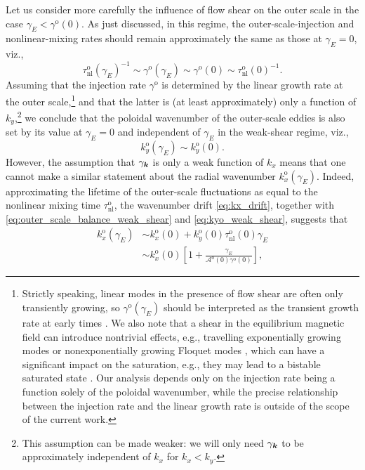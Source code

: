 \documentclass{jpp}
\newcommand{\taunlo}{\tau_\text{nl}^\text{o}}
\newcommand{\kxo}{k_x^\text{o}}
\newcommand{\kyo}{k_y^\text{o}}
\newcommand{\gammao}{\gamma^\text{o}}
\newcommand{\taunloO}{\tau_{\text{nl}}^\text{o}(0)}
\newcommand{\kxoO}{k_{x}^\text{o}(0)}
\newcommand{\kyoO}{k_{y}^\text{o}(0)}
\newcommand{\gammaoO}{\gamma^\text{o}(0)}
\newcommand{\gammaE}{\gamma_{E}}
\newcommand{\A}{\mathcal{A}}
\newcommand{\AoO}{\A^\text{o}(0)}
\begin{document}
Let us consider more carefully the influence of flow shear on the outer scale in the case \(\gammaE < \gammaoO\). As just discussed, in this regime, the outer-scale-injection and nonlinear-mixing rates should remain approximately the same as those at \mbox{\(\gammaE = 0\)}, viz.,
\begin{equation}
	\taunlo(\gammaE)^{-1} \sim \gammao(\gammaE) \sim \gammaoO \sim \taunloO^{-1}.
	\label{eq:outer_scale_balance_weak_shear}
\end{equation}
Assuming that the injection rate \(\gammao\) is determined by the linear growth rate at the outer scale,\footnote{Strictly speaking, linear modes in the presence of flow shear are often only transiently growing, so \(\gammao(\gammaE)\) should be interpreted as the transient growth rate at early times \citep{highcock11, sch12}. We also note that a shear in the equilibrium magnetic field can introduce nontrivial effects, e.g., travelling exponentially growing modes \citep{newton10} or nonexponentially growing Floquet modes \citep{cooper88,waelbroeck91}, which can have a significant impact on the saturation, e.g., they may lead to a bistable saturated state \citep{christen22}. Our analysis depends only on the injection rate being a function solely of the poloidal wavenumber, while the precise relationship between the injection rate and the linear growth rate is outside of the scope of the current work.} and that the latter is (at least approximately) only a function of \(k_y\),\footnote{This assumption can be made weaker: we will only need \(\gamma_{\boldsymbol{k}}\) to be approximately independent of \(k_x\) for \(k_x < k_y\).} we conclude that the poloidal wavenumber of the outer-scale eddies is also set by its value at \(\gammaE=0\) and independent of \(\gammaE\) in the weak-shear regime, viz.,
\begin{equation}
	\kyo(\gammaE) \sim \kyoO.
	\label{eq:kyo_weak_shear}
\end{equation}
However, the assumption that \(\gamma_{\boldsymbol{k}}\) is only a weak function of \(k_x\) means that one cannot make a similar statement about the radial wavenumber \(\kxo(\gammaE)\). Indeed, approximating the lifetime of the outer-scale fluctuations as equal to the nonlinear mixing time \(\taunlo\), the wavenumber drift \cref{eq:kx_drift}, together with \cref{eq:outer_scale_balance_weak_shear} and \cref{eq:kyo_weak_shear}, suggests that
\begin{align}
	\kxo(\gammaE) &\sim \kxoO + \kyoO\taunloO\gammaE \nonumber \\
	&\sim \kxoO \left[1 + \frac{\gammaE}{\AoO \gammaoO}\right],
	\label{eq:kx_weak_shear}
\end{align}
\end{document}
